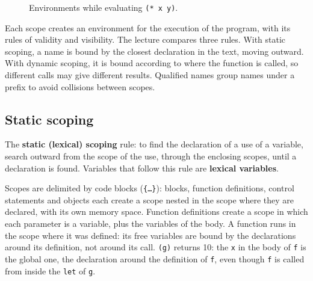 \begin{figure}[h]
\centering
{}
\caption{Environments while evaluating \texttt{(* x y)}.}
\label{fig:let-envs}
\end{figure}

Each scope creates an environment for the execution of the program, with
its rules of validity and visibility. The lecture compares three rules. With
static scoping, a name is bound by the closest declaration in the text,
moving outward. With dynamic scoping, it is bound according to where the
function is called, so different calls may give different results. Qualified
names group names under a prefix to avoid collisions between scopes.

\subsection{Static scoping}

\begin{definition}
The \textbf{static (lexical) scoping} rule: to find the declaration of a use
of a variable, search outward from the scope of the use, through the
enclosing scopes, until a declaration is found. Variables that follow this
rule are \textbf{lexical variables}.
\end{definition}

Scopes are delimited by code blocks (\texttt{\{\dots\}}): blocks, function
definitions, control statements and objects each create a scope nested in
the scope where they are declared, with its own memory space. Function
definitions create a scope in which each parameter is a variable, plus the
variables of the body. A function runs in the scope where it was defined:
its free variables are bound by the declarations around its definition, not
around its call.
\texttt{(g)} returns 10: the \texttt{x} in the body of \texttt{f} is the global
one, the declaration around the definition of \texttt{f}, even though \texttt{f}
is called from inside the \texttt{let} of \texttt{g}.

